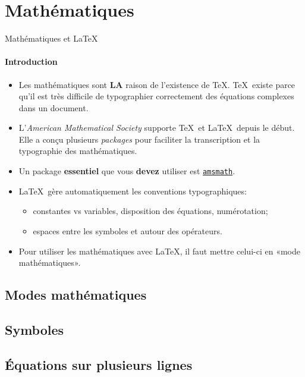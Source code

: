 
\section{Mathématiques}

\begin{frame}[c]{Mathématiques et \LaTeX}
	\framesubtitle{Introduction}

	\begin{itemize}
		\item Les mathématiques sont \textbf{LA} raison de l'existence de \TeX. \TeX\ existe parce qu'il est très difficile de typographier correctement des équations complexes dans un document.
		\item L'\emph{American Mathematical Society} supporte \TeX\ et \LaTeX\ depuis le début. Elle a conçu plusieurs \emph{packages} pour faciliter la transcription et la typographie des mathématiques.
		\item Un package \textbf{essentiel} que vous \textbf{devez} utiliser est 
		\href{https://ctan.org/pkg/amsmath}{\texttt{amsmath}}.
		\item \LaTeX\ gère automatiquement les conventions typographiques:
		\begin{itemize}
			\scriptsize
			\item constantes vs variables, disposition des équations, numérotation;
			\item espaces entre les symboles et autour des opérateurs.
		\end{itemize}
		\item Pour utiliser les mathématiques avec \LaTeX, il faut mettre celui-ci en «mode mathématiques».
	\end{itemize}
\end{frame}

\subsection{Modes mathématiques}



\subsection{Symboles}

\subsection{Équations sur plusieurs lignes}